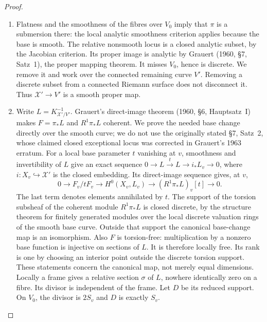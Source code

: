 \begin{proof}
\begin{enumerate}[label=\arabic*.,leftmargin=*]
\item Flatness and the smoothness of the fibres over \(V_0\) imply that
\(\pi\) is a submersion there: the local analytic smoothness criterion
applies because the base is smooth. The relative nonsmooth locus is a
closed analytic subset, by the Jacobian criterion. Its proper image is
analytic by Grauert (1960, \S7, Satz~1), the proper mapping theorem.
It misses \(V_0\), hence is discrete. We remove it and work over the
connected remaining curve \(V'\). Removing a discrete subset from a
connected Riemann surface does not disconnect it. Thus
\(\mathcal X'\to V'\) is a smooth proper map.

\item Write \(L=K_{\mathcal X'/V'}^{-1}\). Grauert's direct-image theorem
(1960, \S6, Hauptsatz~I) makes \(F=\pi_*L\) and \(R^1\pi_*L\)
coherent. We prove the needed base change directly over the smooth
curve; we do not use the originally stated \S7, Satz~2, whose claimed
closed exceptional locus was corrected in Grauert's 1963 erratum.
For a local base parameter \(t\) vanishing at \(v\), smoothness and
invertibility of \(L\) give an exact sequence
\(0\to L\xrightarrow{t}L\to i_*L_v\to0\), where
\(i:X_v\hookrightarrow\mathcal X'\) is the closed embedding.
Its direct-image sequence gives, at \(v\),
\[
 0\longrightarrow F_v/tF_v\longrightarrow H^0(X_v,L_v)
 \longrightarrow (R^1\pi_*L)_v[t]\longrightarrow0.
\]
The last term denotes elements annihilated by \(t\). The support of
the torsion subsheaf of the coherent module \(R^1\pi_*L\) is closed
discrete, by the structure theorem for finitely generated modules
over the local discrete valuation rings of the smooth base curve.
Outside that support the canonical base-change map is an isomorphism.
Also \(F\) is torsion-free: multiplication by a nonzero base function
is injective on sections of \(L\). It is therefore locally free.
Its rank is one by choosing an interior point outside the discrete
torsion support. These statements concern the canonical map, not
merely equal dimensions.
Locally a frame gives a relative section \(\sigma\) of \(L\),
nowhere identically zero on a fibre. Its divisor is independent of the
frame. Let \(D\) be its reduced support. On \(V_0\), the divisor is
\(2S_v\) and \(D\) is exactly \(S_v\).


\end{enumerate}
\end{proof}
